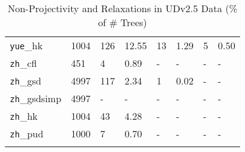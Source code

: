 \begin{longtable}{|l|l|l|l|l|l|l|l|}
\texttt{yue}\_hk & 1004 & 126 & 12.55 & 13 & 1.29 & 5 & 0.50\\
\texttt{zh}\_cfl & 451 & 4 & 0.89 & - & - & - & -\\
\texttt{zh}\_gsd & 4997 & 117 & 2.34 & 1 & 0.02 & - & -\\
\texttt{zh}\_gsdsimp & 4997 & - & - & - & - & - & -\\
\texttt{zh}\_hk & 1004 & 43 & 4.28 & - & - & - & -\\
\texttt{zh}\_pud & 1000 & 7 & 0.70 & - & - & - & -\\
\hline
\caption{Non-Projectivity and Relaxations in UDv2.5 Data (\% of \# Trees)}
\end{longtable}